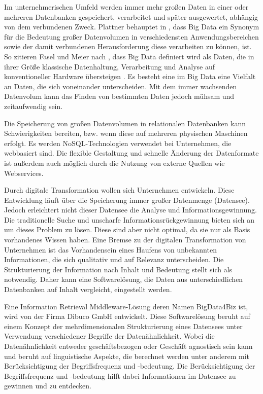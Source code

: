 Im unternehmerischen Umfeld werden immer mehr großen Daten in einer oder mehreren Datenbanken gespeichert, verarbeitet und später ausgewertet, abhängig von dem verbundenen Zweck. Plattner behauptet in \cite{ENZ17}, dass Big Data ein Synonym für die Bedeutung großer Datenvolumen in verschiedensten Anwendungsbereichen sowie der damit verbundenen Herausforderung diese verarbeiten zu können, ist. So zitieren Fasel und Meier nach \cite{MER11}, dass Big Data definiert wird als Daten, die in ihrer Größe klassische Datenhaltung, Verarbeitung und Analyse auf konventioneller Hardware übersteigen \cite{FAM16}. Es besteht eine im Big Data eine Vielfalt an Daten, die sich voneinander unterscheiden. Mit dem immer wachsenden Datenvolum kann das Finden von bestimmten Daten jedoch mühsam und zeitaufwendig sein. 

Die Speicherung von großen Datenvolumen in relationalen Datenbanken kann Schwierigkeiten bereiten, bzw. wenn diese auf mehreren physischen Maschinen erfolgt. Es werden NoSQL-Technologien verwendet bei Unternehmen, die webbasiert sind. Die flexible Gestaltung und schnelle Änderung der Datenformate ist außerdem auch möglich durch die Nutzung von externe Quellen wie Webservices.

Durch digitale Transformation wollen sich Unternehmen entwickeln. Diese Entwicklung läuft über die Speicherung immer großer Datenmenge (Datensee). Jedoch erleichtert nicht dieser Datensee die Analyse und Informationsgewinnung. Die traditionelle Suche und unscharfe Informationsrückgewinnung bieten sich an um dieses Problem zu lösen. Diese sind aber nicht optimal, da sie nur als Basis vorhandenes Wissen haben. Eine Bremse zu der digitalen Transformation von Unternehmen ist das Vorhandensein eines Haufens von unbekannten Informationen, die sich qualitativ und auf Relevanz unterscheiden. Die Strukturierung der Information nach Inhalt und Bedeutung stellt sich als notwendig. Daher kann eine Softwarelösung, die Daten aus unterschiedlichen Datenbanken auf Inhalt vergleicht, eingestellt werden.

Eine Information Retrieval Middleware-Lösung deren Namen BigData4Biz ist, wird von der Firma Dibuco GmbH entwickelt. Diese Softwarelösung beruht auf einem Konzept der mehrdimensionalen Strukturierung eines Datensees unter Verwendung verschiedener Begriffe der Datenähnlichkeit.  Wobei die Datenähnlichkeit entweder geschäftsbezogen oder Geschäft agnostisch sein kann und beruht auf linguistische Aspekte, die berechnet werden unter anderem mit Berücksichtigung der Begriffsfrequenz und -bedeutung. Die Berücksichtigung der Begriffsfrequenz und -bedeutung hilft dabei Informationen im Datensee zu gewinnen und zu entdecken.

